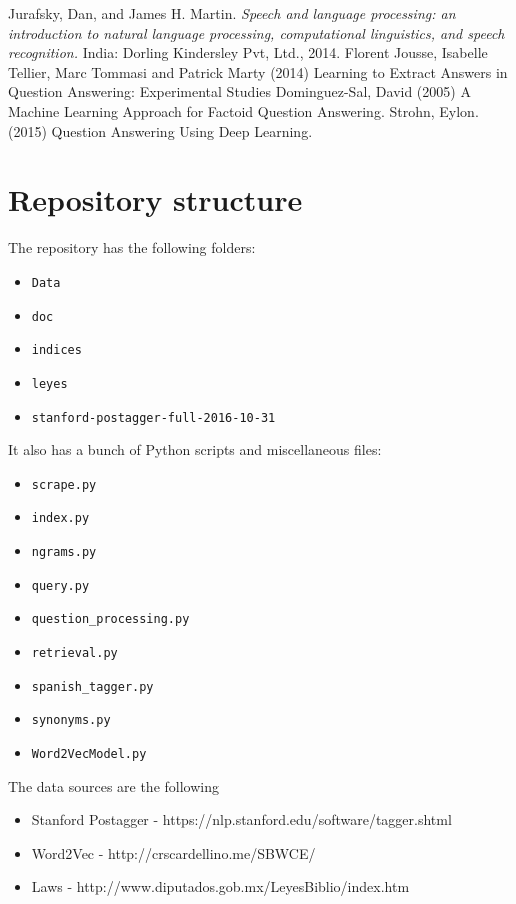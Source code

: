 \documentclass[letterpaper, margin=1in]{article}
\begin{document}
\begin{thebibliography}{9}
  Jurafsky, Dan, and James H. Martin. 
  \emph{Speech and language processing: an introduction to natural language processing, computational linguistics, and speech recognition.} 
  India: Dorling Kindersley Pvt, Ltd., 2014.
 Florent Jousse, Isabelle Tellier, Marc Tommasi and Patrick Marty (2014) Learning to Extract Answers in Question Answering: Experimental Studies
 Dominguez-Sal, David (2005) A Machine Learning Approach for Factoid Question Answering.
Strohn, Eylon. (2015) Question Answering Using Deep Learning. 

\end{thebibliography}

\newpage
\appendix

\section{Repository structure}
The repository has the following folders:
\begin{itemize}
\item \texttt{Data}
\item \texttt{doc}
\item \texttt{indices}
\item \texttt{leyes}
\item \texttt{stanford-postagger-full-2016-10-31}
\end{itemize}

It also has a bunch of Python scripts and miscellaneous files:

\begin{itemize}
\item \texttt{scrape.py}
\item \texttt{index.py}
\item \texttt{ngrams.py}
\item \texttt{query.py}
\item \texttt{question{\_}processing.py}
\item \texttt{retrieval.py}
\item \texttt{spanish{\_}tagger.py}
\item \texttt{synonyms.py}
\item \texttt{Word2VecModel.py}
\end{itemize}

The data sources are the following 
\begin{itemize}
\item Stanford Postagger - https://nlp.stanford.edu/software/tagger.shtml
\item Word2Vec - http://crscardellino.me/SBWCE/
\item Laws - http://www.diputados.gob.mx/LeyesBiblio/index.htm
\end{itemize}
\end{document}
